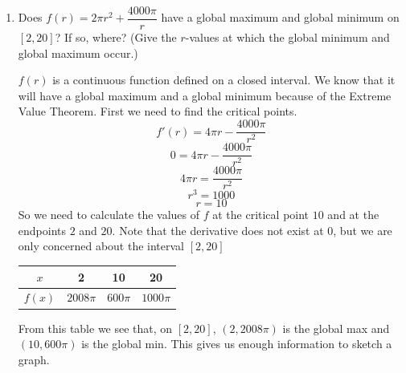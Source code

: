 \documentclass{article}
\begin{document}
\begin{enumerate}

  \begin{enumerate} 
  \item \label{optimization-can-1-abs-extrema-domain1}

    \begin{problem}[\vfill]
      Does $f(r) = 2 \pi r^2 + \dfrac{4000 \pi}{r}$ have a global maximum and global minimum on $[2, 20]$? If so, where? (Give the $r$-values at which the global minimum and global maximum occur.)
    \end{problem}

    \begin{solution}
      $f(r)$ is a continuous function defined on a closed interval. We know that it will have a global maximum and a global minimum because of the {Extreme Value Theorem}. First
      we need to find the critical points.
        $$f'(r) = 4 \pi r - \frac{4000 \pi} {r^2}$$
        $$ 0  =4 \pi r - \frac{4000 \pi} {r^2}$$
        $$ 4 \pi r = \frac{4000 \pi} {r^2}$$
        $$ r^3 = 1000$$ 
        $$ r =10$$ 
        So we need to calculate the values of $f$ at the critical point $10$ and 
        at the endpoints $2$ and $20$. 
        Note that the derivative does not exist at $0$, but we are only concerned about the 
        interval $[2,20]$
        \begin{center} 
          \begin{tabular} {c || c | c| c } 
            $x$ & 2 & 10 & 20  \\ 
            \hline 
            $f(x)$ &$2008 \pi$ &$600 \pi$  &$1000 \pi$ 
          \end{tabular} 
        \end{center} 
        From this table we see that, on $[2, 20]$,
        $(2,2008 \pi)$ is the global max and $(10, 600 \pi)$ is the global min. 
        This gives us enough information to sketch a graph. 
      \begin{center} 
      \end{center} 
    \end{solution}


\end{enumerate}
\end{enumerate}
\end{document}
